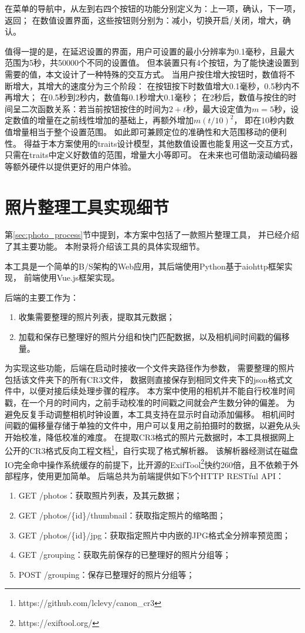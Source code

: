 在菜单的导航中，从左到右四个按钮的功能分别定义为：上一项，确认，下一项，返回；
在数值设置界面，这些按钮则分别为：减小，切换开启/关闭，增大，确认。

值得一提的是，在延迟设置的界面，用户可设置的最小分辨率为0.1毫秒，且最大范围为5秒，共50000个不同的设置值。
但本装置只有4个按钮，为了能快速设置到需要的值，本文设计了一种特殊的交互方式。
当用户按住增大按钮时，数值将不断增大，其增大的速度分为三个阶段：
在按钮按下时数值增大0.1毫秒，0.5秒内不再增大；
在0.5秒到2秒内，数值每0.1秒增大0.1毫秒；
在2秒后，数值与按住的时间呈二次函数关系：若当前按钮按住的时间为$2+t$秒，最大设定值为$m=5$秒，设定数值的增量在之前线性增加的基础上，再额外增加$m(t/10)^2$，
即在10秒内数值增量相当于整个设置范围。
如此即可兼顾定位的准确性和大范围移动的便利性。
得益于本方案使用的traits设计模型，其他数值设置也能复用这一交互方式，只需在traits中定义好数值的范围，增量大小等即可。
在未来也可借助滚动编码器等额外硬件以提供更好的用户体验。

\chapter{照片整理工具实现细节}
\label{app:pick_photo_impl}

第\ref{sec:photo_process}节中提到，本方案中包括了一款照片整理工具，
并已经介绍了其主要功能。
本附录将介绍该工具的具体实现细节。

本工具是一个简单的B/S架构的Web应用，其后端使用Python基于aiohttp框架实现，
前端使用Vue.js框架实现。

后端的主要工作为：
\begin{enumerate}
\item 收集需要整理的照片列表，提取其元数据；
\item 加载和保存已整理好的照片分组和快门匹配数据，以及相机间时间戳的偏移量。
\end{enumerate}
为实现这些功能，后端在启动时接收一个文件夹路径作为参数，
需要整理的照片包括该文件夹下的所有CR3文件，
数据则直接保存到相同文件夹下的json格式文件中，以便对接后续处理步骤的程序。
本方案中使用的相机并不能自行校准时间戳，在一个月的时间内，之前手动校准的时间戳之间就会产生数分钟的偏差。
为避免反复手动调整相机时钟设置，本工具支持在显示时自动添加偏移。
相机间时间戳的偏移量存储于单独的文件中，用户可以复用之前拍摄时的数据，以避免从头开始校准，降低校准的难度。
在提取CR3格式的照片元数据时，本工具根据网上公开的CR3格式反向工程文档\footnote{https://github.com/lclevy/canon\_cr3}，自行实现了格式解析器。
该解析器经测试在磁盘IO完全命中操作系统缓存的前提下，比开源的ExifTool\footnote{https://exiftool.org/}快约260倍，且不依赖于外部程序，使用更加简单。
后端总共为前端提供如下5个HTTP RESTful API：
\begin{enumerate}
\item GET /photos：获取照片列表，及其元数据；
\item GET /photos/\{id\}/thumbnail：获取指定照片的缩略图；
\item GET /photos/\{id\}/jpg：获取指定照片中内嵌的JPG格式全分辨率预览图；
\item GET /grouping：获取先前保存的已整理好的照片分组等；
\item POST /grouping：保存已整理好的照片分组等；
\end{enumerate}

